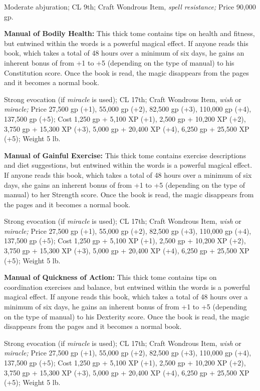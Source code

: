 Moderate abjuration; CL 9th; Craft Wondrous Item, \textit{spell resistance; }Price 
90,000 gp.

\textbf{Manual of Bodily Health: }This thick tome contains tips on health and fitness, 
but entwined within the words is a powerful magical effect. If anyone reads this 
book, which takes a total of 48 hours over a minimum of six days, he gains an inherent 
bonus of from +1 to +5 (depending on the type of manual) to his Constitution score. 
Once the book is read, the magic disappears from the pages and it becomes a normal 
book.

Strong evocation (if \textit{miracle }is used); CL 17th; Craft Wondrous Item, \textit{wish 
}or \textit{miracle; }Price 27,500 gp (+1), 55,000 gp (+2), 82,500 gp (+3), 110,000 
gp (+4), 137,500 gp (+5); Cost 1,250 gp + 5,100 XP (+1), 2,500 gp + 10,200 XP (+2), 
3,750 gp + 15,300 XP (+3), 5,000 gp + 20,400 XP (+4), 6,250 gp + 25,500 XP (+5); 
Weight 5 lb.

\textbf{Manual of Gainful Exercise:} This thick tome contains exercise descriptions 
and diet suggestions, but entwined within the words is a powerful magical effect. 
If anyone reads this book, which takes a total of 48 hours over a minimum of six 
days, she gains an inherent bonus of from +1 to +5 (depending on the type of manual) 
to her Strength score. Once the book is read, the magic disappears from the pages 
and it becomes a normal book.

Strong evocation (if \textit{miracle }is used); CL 17th; Craft Wondrous Item, \textit{wish 
}or \textit{miracle; }Price 27,500 gp (+1), 55,000 gp (+2), 82,500 gp (+3), 110,000 
gp (+4), 137,500 gp (+5); Cost 1,250 gp + 5,100 XP (+1), 2,500 gp + 10,200 XP (+2), 
3,750 gp + 15,300 XP (+3), 5,000 gp + 20,400 XP (+4), 6,250 gp + 25,500 XP (+5); 
Weight 5 lb.

\textbf{Manual of Quickness of Action:} This thick tome contains tips on coordination 
exercises and balance, but entwined within the words is a powerful magical effect. 
If anyone reads this book, which takes a total of 48 hours over a minimum of six 
days, he gains an inherent bonus of from +1 to +5 (depending on the type of manual) 
to his Dexterity score. Once the book is read, the magic disappears from the pages 
and it becomes a normal book.

Strong evocation (if \textit{miracle }is used); CL 17th; Craft Wondrous Item, \textit{wish 
}or \textit{miracle; }Price 27,500 gp (+1), 55,000 gp (+2), 82,500 gp (+3), 110,000 
gp (+4), 137,500 gp (+5); Cost 1,250 gp + 5,100 XP (+1), 2,500 gp + 10,200 XP (+2), 
3,750 gp + 15,300 XP (+3), 5,000 gp + 20,400 XP (+4), 6,250 gp + 25,500 XP (+5); 
Weight 5 lb.

